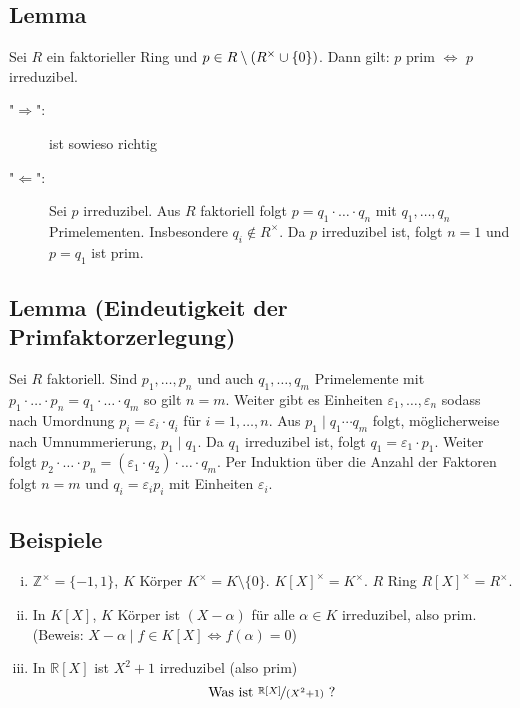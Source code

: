 \subsection[Lemma: In faktoriellen Ringen ist prim äquivalent zu irreduzibel]{Lemma} %
\label{sub:710}
Sei $R$ ein faktorieller Ring und $p \in R\setminus \enbrace*{R^\times \cup \{0\}} $. Dann gilt: $p$ prim $\iff$ $p$ irreduzibel.
\begin{description}
	\item["$\Rightarrow $":] ist sowieso richtig
	\item["$\Leftarrow$":] Sei $p$ irreduzibel. Aus $R$ faktoriell folgt $p = q_1 \cdot \ldots \cdot q_n$ mit $q_1, \ldots , q_n$ Primelementen. Insbesondere 
	$q_i \not\in R^\times$. Da $p$ irreduzibel ist, folgt $n=1$ und $p= q_1$ ist prim. \bewende
\end{description}

\subsection{Lemma (Eindeutigkeit der Primfaktorzerlegung)} %
\label{sub:711}
Sei $R$ faktoriell. Sind $p_1, \ldots , p_n$ und auch $q_1, \ldots , q_m$ Primelemente mit $p_1 \cdot \ldots \cdot p_n = q_1 \cdot \ldots \cdot q_m$ so gilt $n=m$. Weiter gibt es Einheiten $\varepsilon_1, \ldots ,\varepsilon_n$ sodass nach Umordnung $p_i = \varepsilon_i \cdot q_i$ für $i=1,\ldots ,n$.
Aus $p_1 \mid q_1 \cdots q_m$ folgt, möglicherweise nach Umnummerierung, $p_1 \mid q_1$. Da $q_1$ irreduzibel ist, folgt $q_1 = \varepsilon_1 \cdot p_1$. Weiter folgt
$p_2 \cdot \ldots \cdot p_n = (\varepsilon_1 \cdot q_2) \cdot \ldots \cdot q_m$. Per Induktion über die Anzahl der Faktoren folgt $n= m$ und $q_i =  \varepsilon_i p_i$
mit Einheiten $\varepsilon_i$. \bewende

\subsection[Beispiele: Einheitengruppen, irreduzible Elemente]{Beispiele} %
\label{sub:712}
\begin{enumerate}[(i)]
	\item $\mathds{Z}^\times = \{-1,1\}$, $K$ Körper $K^\times = K \setminus \{0\}$.
	$K[X]^\times = K^\times$. $R$ Ring $R[X]^\times = R^\times$.
	\item In $K[X]$, $K$ Körper ist $(X- \alpha)$ für alle $\alpha \in K$ irreduzibel, also prim. \\
	(Beweis: $X- \alpha \mid f \in K[X] \iff f(\alpha)=0$)
	\item In $\mathds{R}[X]$ ist $X^2+1$ irreduzibel (also prim)
	\[
		\text{Was ist }\nicefrac{\mathds{R}[X]}{(X^2+1)} \text{ ?}
	\]
\end{enumerate}

